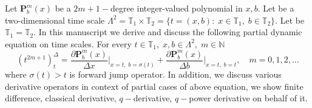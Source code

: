 Let $\mathbf{P}_b^m(x)$ be a $2m+1-$degree integer-valued polynomial in $x,b$.
Let be a two-dimensional time scale
$\Lambda^2 = \mathbb{T}_1 \times \mathbb{T}_2 = \{t=(x, b) \colon \; x\in\mathbb{T}_1, \; b\in\mathbb{T}_2 \}$.
Let be $\mathbb{T}_1 = \mathbb{T}_2$.
In this manuscript we derive and discuss the following partial dynamic equation on time scales.
For every $t\in\mathbb{T}_1, \; x,b\in \Lambda^2, \; m\in\mathbb{N}$
\[
    (t^{2m+1})^{\Delta}_{t} =
    \frac{\partial \mathbf{P}_b^m(x)}{\Delta x} \bigg |_{x = t, \; b = \sigma(t)}+
    \frac{\partial \mathbf{P}_b^m(x)}{\Delta b}\bigg |_{x = t, \; b = t}, \quad m = 0,1,2,\dots
\]
where $\sigma(t) > t$ is forward jump operator.
In addition, we discuss various derivative operators in context of partial cases of above equation,
we show finite difference, classical derivative, $q-$derivative, $q-$power derivative on behalf of it.